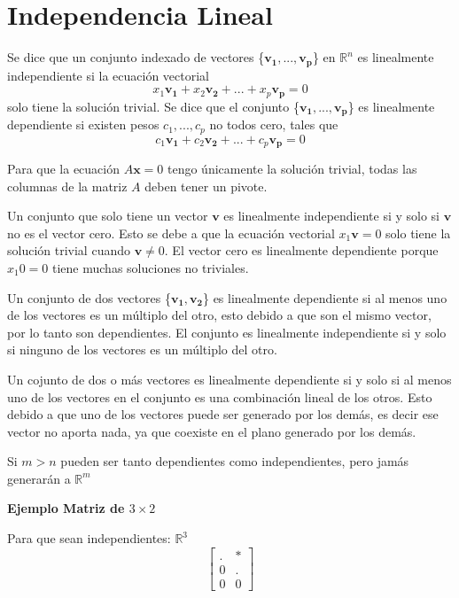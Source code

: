 \documentclass{article}
\begin{document}
\section{Independencia Lineal}

Se dice que un conjunto indexado de vectores \{$\mathbf{v_1},..., \mathbf{v_p}$\} en $\mathbb{R}^n$ es linealmente independiente si la ecuación vectorial $$x_1\mathbf{v_1} + x_2\mathbf{v_2} + ... + x_p\mathbf{v_p} = 0$$
solo tiene la solución trivial. Se dice que el conjunto \{$\mathbf{v_1},..., \mathbf{v_p}$\} es linealmente dependiente si existen pesos $c_1, ..., c_p$ no todos cero, tales que $$c_1\mathbf{v_1} + c_2\mathbf{v_2} + ... + c_p\mathbf{v_p} = 0$$

Para que la ecuación $A\mathbf{x} = 0$ tengo únicamente la solución trivial, todas las columnas de la matriz $A$ deben tener un pivote.

Un conjunto que solo tiene un vector $\mathbf{v}$ es linealmente independiente si y solo si $\mathbf{v}$ no es el vector cero. Esto se debe a que la ecuación vectorial $x_1\mathbf{v} = 0$ solo tiene la solución trivial cuando $\mathbf{v} \neq 0$. El vector cero es linealmente dependiente porque $x_{1}0=0$
tiene muchas soluciones no triviales.

Un conjunto de dos vectores \{$\mathbf{v_1}, \mathbf{v_2}$\} es linealmente dependiente si al menos uno de los vectores es un múltiplo del otro, esto debido a que son el mismo vector, por lo tanto son dependientes. El conjunto es linealmente independiente si y solo si ninguno de los vectores es un múltiplo del otro.

Un cojunto de dos o más vectores es linealmente dependiente si y solo si al menos uno de los vectores en el conjunto es una combinación lineal de los otros. Esto debido a que uno de los vectores puede ser generado por los demás, es decir ese vector no aporta nada, ya que coexiste en el plano generado por los demás. 

Si $m > n$ pueden ser tanto dependientes como independientes, pero jamás generarán a $\mathbb{R}^m$

\begin{large}
    \textbf{Ejemplo Matriz de $3 \times 2$}
\end{large}

Para que sean independientes: $\mathbb{R}^3$ $$\begin{bmatrix}
    . & *\\
    0 & .\\
    0 & 0
\end{bmatrix}$$
\end{document}
